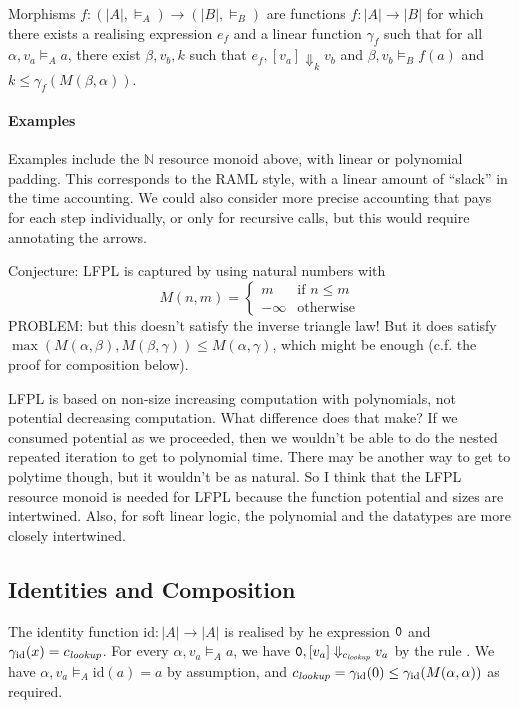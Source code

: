 \documentclass{workingnote}
\newcommand{\id}{\mathrm{id}}
\begin{document}
Morphisms $f : (|A|, \models_A) \to (|B|, \models_B)$ are functions
$f : |A| \to |B|$ for which there exists a realising expression $e_f$
and a linear function $\gamma_f$ such that for all
$\alpha, v_a \models_A a$, there exist $\beta, v_b, k$ such that
$e_f, [v_a] \Downarrow_k v_b$ and $\beta, v_b \models_B f(a)$ and
$k \leq \gamma_f(M(\beta, \alpha))$.

\paragraph{Examples} Examples include the $\mathbb{N}$ resource monoid
above, with linear or polynomial padding. This corresponds to the RAML
style, with a linear amount of ``slack'' in the time accounting. We
could also consider more precise accounting that pays for each step
individually, or only for recursive calls, but this would require
annotating the arrows.

Conjecture: LFPL is captured by using natural numbers with
\begin{displaymath}
  M(n,m) = \left\{\begin{array}{ll} m & \textrm{if }n \leq m \\ -\infty & \textrm{otherwise} \end{array}\right.
\end{displaymath}
PROBLEM: but this doesn't satisfy the inverse triangle law! But it
does satisfy
$\max(M(\alpha, \beta), M(\beta, \gamma)) \leq M(\alpha, \gamma)$,
which might be enough (c.f. the proof for composition below).

LFPL is based on non-size increasing computation with polynomials, not
potential decreasing computation. What difference does that make? If
we consumed potential as we proceeded, then we wouldn't be able to do
the nested repeated iteration to get to polynomial time. There may be
another way to get to polytime though, but it wouldn't be as
natural. So I think that the LFPL resource monoid is needed for LFPL
because the function potential and sizes are intertwined. Also, for
soft linear logic, the polynomial and the datatypes are more closely
intertwined.

\subsection{Identities and Composition}

The identity function $\id : |A| \to |A|$ is realised by he expression
$\texttt{0}$ and $\gamma_\id(x) = \cnstLookup$. For every
$\alpha, v_a \models_A a$, we have
$\texttt{0}, [v_a] \Downarrow_{c_{\mathit{lookup}}} v_a$ by the rule
. We have $\alpha, v_a \models_A \id(a) = a$ by
assumption, and
$\cnstLookup = \gamma_\id(0) \leq \gamma_\id(M(\alpha, \alpha))$ as
required.
\end{document}
